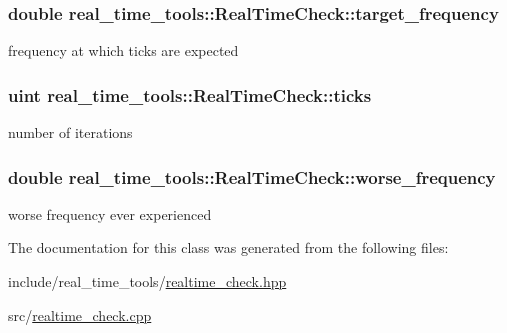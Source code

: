 \subsubsection[{\texorpdfstring{target\+\_\+frequency}{target_frequency}}]{\setlength{\rightskip}{0pt plus 5cm}double real\+\_\+time\+\_\+tools\+::\+Real\+Time\+Check\+::target\+\_\+frequency\hspace{0.3cm}{\ttfamily [private]}}\hypertarget{classreal__time__tools_1_1RealTimeCheck_a126c13a50d06703c515b35f87c3e867c}{}\label{classreal__time__tools_1_1RealTimeCheck_a126c13a50d06703c515b35f87c3e867c}
frequency at which ticks are expected 
\subsubsection[{\texorpdfstring{ticks}{ticks}}]{\setlength{\rightskip}{0pt plus 5cm}uint real\+\_\+time\+\_\+tools\+::\+Real\+Time\+Check\+::ticks\hspace{0.3cm}{\ttfamily [private]}}\hypertarget{classreal__time__tools_1_1RealTimeCheck_ae2acb20d9f1e49cc35eb5505d63201aa}{}\label{classreal__time__tools_1_1RealTimeCheck_ae2acb20d9f1e49cc35eb5505d63201aa}
number of iterations 
\subsubsection[{\texorpdfstring{worse\+\_\+frequency}{worse_frequency}}]{\setlength{\rightskip}{0pt plus 5cm}double real\+\_\+time\+\_\+tools\+::\+Real\+Time\+Check\+::worse\+\_\+frequency\hspace{0.3cm}{\ttfamily [private]}}\hypertarget{classreal__time__tools_1_1RealTimeCheck_a3605c41d8c5c616879fa9af469860470}{}\label{classreal__time__tools_1_1RealTimeCheck_a3605c41d8c5c616879fa9af469860470}
worse frequency ever experienced 

The documentation for this class was generated from the following files\+:\begin{DoxyCompactItemize}
\item 
include/real\+\_\+time\+\_\+tools/\hyperlink{realtime__check_8hpp}{realtime\+\_\+check.\+hpp}\item 
src/\hyperlink{realtime__check_8cpp}{realtime\+\_\+check.\+cpp}\end{DoxyCompactItemize}
